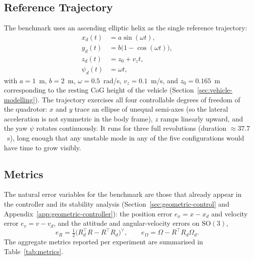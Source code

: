 \documentclass[11pt]{article}
\theoremstyle{remark}
\newcommand{\SO}{\mathrm{SO}(3)}
\begin{document}
\subsection{Reference Trajectory}
The benchmark uses an ascending elliptic helix as the single reference trajectory:
\begin{align}
    x_d(t) &= a\sin(\omega t), \\
    y_d(t) &= b\bigl(1 - \cos(\omega t)\bigr), \\
    z_d(t) &= z_0 + v_z t, \\
    \psi_d(t) &= \omega t,
\end{align}
with $a = 1$~m, $b = 2$~m, $\omega = 0.5$~rad/s, $v_z = 0.1$~m/s, and $z_0 = 0.165$~m corresponding to the resting CoG height of the vehicle (Section~\ref{sec:vehicle-modelling}). The trajectory exercises all four controllable degrees of freedom of the quadrotor: $x$ and $y$ trace an ellipse of unequal semi-axes (so the lateral acceleration is not symmetric in the body frame), $z$ ramps linearly upward, and the yaw $\psi$ rotates continuously. It runs for three full revolutions (duration $\approx 37.7$~s), long enough that any unstable mode in any of the five configurations would have time to grow visibly.

\subsection{Metrics}
\label{sec:metrics}

The natural error variables for the benchmark are those that already appear in the controller and its stability analysis (Section~\ref{sec:geometric-control} and Appendix~\ref{app:geometric-controller}): the position error $e_x = x - x_d$ and velocity error $e_v = v - v_d$, and the attitude and angular-velocity errors on $\SO$,
\begin{equation}
    e_R = \tfrac{1}{2}\bigl(R_d^\top R - R^\top R_d\bigr)^\vee,
    \qquad
    e_\Omega = \Omega - R^\top R_d \Omega_d.
\end{equation}
The aggregate metrics reported per experiment are summarised in Table~\ref{tab:metrics}.
\end{document}
